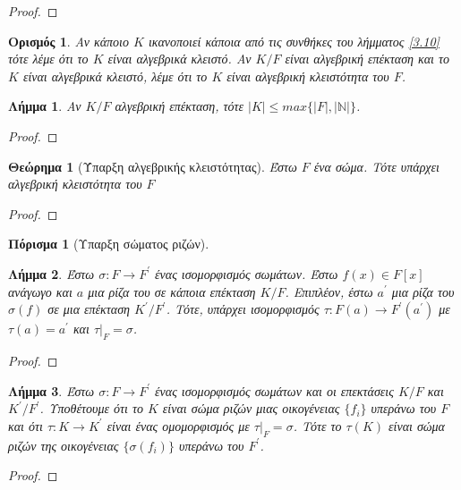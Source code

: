 \documentclass[oneside,a4paper]{article}
\newtheorem{theorem}{Θεώρημα}
\newtheorem{lemma}{Λήμμα}
\newtheorem*{defn}{Ορισμός}
\newtheorem{cor}{Πόρισμα}
\begin{document}
\begin{proof}
\end{proof}

\begin{defn} Αν κάποιο $K$ ικανοποιεί κάποια από τις συνθήκες του λήμματος \ref{3.10} τότε λέμε ότι το $K$ είναι αλγεβρικά κλειστό. Αν $K/F$ είναι αλγεβρική επέκταση και το $K$ είναι αλγεβρικά κλειστό, λέμε ότι το $K$ είναι αλγεβρική κλειστότητα του $F$.
\end{defn}

\begin{lemma}
	Αν $K/F$ αλγεβρική επέκταση, τότε $|K| \leq max\{|F| , |\mathbb N|\}$.
\end{lemma}
\begin{proof}
\end{proof}


\begin{theorem}[Ύπαρξη αλγεβρικής κλειστότητας]
	Έστω $F$ ένα σώμα. Τότε υπάρχει αλγεβρική κλειστότητα του $F$
\end{theorem}
\begin{proof}
\end{proof}


\begin{cor}[Υπαρξη σώματος ριζών]
\end{cor}


\begin{lemma} Έστω $\sigma : F \rightarrow F^{\prime}$ ένας ισομορφισμός σωμάτων. Έστω $f(x) \in F[x]$ ανάγωγο και $a$ μια ρίζα του σε κάποια επέκταση $K/F$. Επιπλέον, έστω $a^{\prime}$ μια ρίζα του $\sigma(f)$ σε μια επέκταση $K^{\prime} / F^{\prime}$. Τότε, υπάρχει ισομορφισμός $\tau : F(a) \rightarrow F^{\prime} ( a ^{\prime})$ με $\tau (a) = a^{\prime}$ και $\tau|_F = \sigma$.
\end{lemma}

\begin{proof}%
\end{proof}

\begin{lemma} Έστω $\sigma : F \rightarrow F^{\prime}$ ένας ισομορφισμός σωμάτων και οι επεκτάσεις $K/F$ και $K^{\prime} / F^{\prime}$. Υποθέτουμε ότι το $K$ είναι σώμα ριζών μιας οικογένειας $\{f_i\}$ υπεράνω του $F$ και ότι $\tau : K \rightarrow K^{\prime}$ είναι ένας ομομορφισμός με $\tau|_F = \sigma$. Τότε το $\tau(K)$ είναι σώμα ριζών της οικογένειας $\{\sigma(f_i) \}$ υπεράνω του $F^{\prime}$.
\end{lemma}

\begin{proof}
\end{proof}
\end{document}
